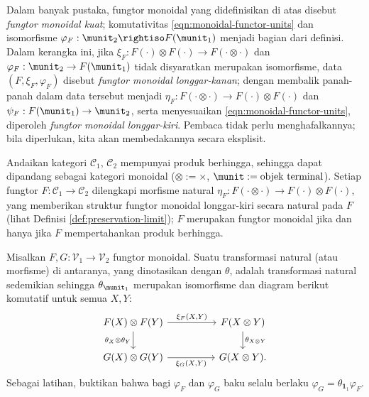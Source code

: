 \begin{remark}
	Dalam banyak pustaka, fungtor monoidal yang didefinisikan di atas disebut \emph{fungtor monoidal kuat}; komutativitas \eqref{eqn:monoidal-functor-units} dan isomorfisme $\varphi_F: \munit_2 \rightiso F(\munit_1)$ menjadi bagian dari definisi. Dalam kerangka ini, jika $\xi_F: F(\cdot) \otimes F(\cdot) \to F(\cdot \otimes \cdot)$ dan $\varphi_F: \munit_2 \to F(\munit_1)$ tidak disyaratkan merupakan isomorfisme, data $(F, \xi_F, \varphi_F)$ disebut \emph{fungtor monoidal longgar-kanan}; dengan membalik panah-panah dalam data tersebut menjadi $\eta_F: F(\cdot \otimes \cdot) \to F(\cdot) \otimes F(\cdot)$ dan $\psi_F: F(\munit_1) \to \munit_2$, serta menyesuaikan \eqref{eqn:monoidal-functor-units}, diperoleh \emph{fungtor monoidal longgar-kiri}. Pembaca tidak perlu menghafalkannya; bila diperlukan, kita akan membedakannya secara eksplisit. 
\end{remark}

\begin{example}
	Andaikan kategori $\mathcal{C}_1$, $\mathcal{C}_2$ mempunyai produk berhingga, sehingga dapat dipandang sebagai kategori monoidal ($\otimes := \times$, $\munit := \text{objek terminal}$). Setiap fungtor $F: \mathcal{C}_1 \to \mathcal{C}_2$ dilengkapi morfisme natural $\eta_F: F(\cdot \otimes \cdot) \to F(\cdot) \otimes F(\cdot)$, yang memberikan struktur fungtor monoidal longgar-kiri secara natural pada $F$ (lihat Definisi \ref{def:preservation-limit}); $F$ merupakan fungtor monoidal jika dan hanya jika $F$ mempertahankan produk berhingga.
\end{example}

\begin{definition}
	Misalkan $F, G: \mathcal{V}_1 \to \mathcal{V}_2$ fungtor monoidal. Suatu transformasi natural (atau morfisme) di antaranya, yang dinotasikan dengan $\theta$, adalah transformasi natural sedemikian sehingga $\theta_{\munit_1}$ merupakan isomorfisme dan diagram berikut komutatif untuk semua $X, Y$:
	\[ \begin{tikzcd}[column sep=huge]
		F(X) \otimes F(Y) \arrow[r, "{\xi_F(X, Y)}"] \arrow[d, "{\theta_X \otimes \theta_Y}"'] & F(X \otimes Y) \arrow[d, "{\theta_{X \otimes Y}}"] \\
		G(X) \otimes G(Y) \arrow[r, "{\xi_G(X, Y)}"'] & G(X \otimes Y) .
	\end{tikzcd} \]
	Sebagai latihan, buktikan bahwa bagi $\varphi_F$ dan $\varphi_G$ baku selalu berlaku $\varphi_G = \theta_{\mathbf{1}_1} \varphi_F$.
\end{definition}

